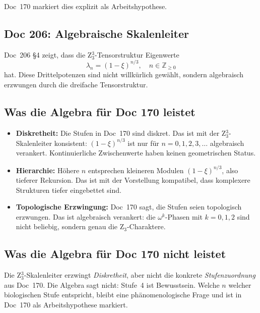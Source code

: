 Doc~170 markiert dies explizit als Arbeitshypothese.

\subsection{Doc 206: Algebraische Skalenleiter}

Doc~206 \S4 zeigt, dass die Z$_3^3$-Tensorstruktur Eigenwerte
\[
\lambda_n = (1-\xi)^{n/3}, \quad n \in \mathbb{Z}_{\geq 0}
\]
hat. Diese Drittelpotenzen sind nicht willkürlich gewählt, sondern algebraisch erzwungen durch die dreifache Tensorstruktur.

\subsection{Was die Algebra für Doc 170 leistet}

\begin{itemize}
\item \textbf{Diskretheit:} Die Stufen in Doc~170 sind diskret. Das ist mit der Z$_3^3$-Skalenleiter konsistent: $(1-\xi)^{n/3}$ ist nur für $n = 0, 1, 2, 3, \dots$ algebraisch verankert. Kontinuierliche Zwischenwerte haben keinen geometrischen Status.
\item \textbf{Hierarchie:} Höhere $n$ entsprechen kleineren Modulen $(1-\xi)^{n/3}$, also tieferer Rekursion. Das ist mit der Vorstellung kompatibel, dass komplexere Strukturen tiefer eingebettet sind.
\item \textbf{Topologische Erzwingung:} Doc~170 sagt, die Stufen seien \glqq topologisch erzwungen\grqq{}. Das ist algebraisch verankert: die $\omega^k$-Phasen mit $k = 0, 1, 2$ sind nicht beliebig, sondern genau die Z$_3$-Charaktere.
\end{itemize}

\subsection{Was die Algebra für Doc 170 nicht leistet}

\begin{important}
Die Z$_3^3$-Skalenleiter erzwingt \emph{Diskretheit}, aber nicht die konkrete \emph{Stufenzuordnung} aus Doc~170. Die Algebra sagt nicht: \glqq Stufe~4 ist Bewusstsein\grqq{}. Welche $n$ welcher biologischen Stufe entspricht, bleibt eine phänomenologische Frage und ist in Doc~170 als Arbeitshypothese markiert.
\end{important}

